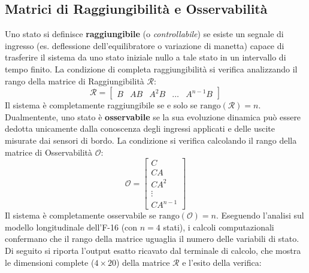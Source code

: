 \subsection{Matrici di Raggiungibilità e Osservabilità}
Uno stato si definisce \textbf{raggiungibile} (o \textit{controllabile}) se esiste un segnale di ingresso (es. deflessione dell'equilibratore o variazione di manetta) capace di trasferire il sistema da uno stato iniziale nullo a tale stato in un intervallo di tempo finito. La condizione di completa raggiungibilità si verifica analizzando il rango della matrice di Raggiungibilità $\mathcal{R}$:
\begin{equation}
    \mathcal{R} = \begin{bmatrix} B & AB & A^2B & \dots & A^{n-1}B \end{bmatrix}
\end{equation}
Il sistema è completamente raggiungibile se e solo se $\text{rango}(\mathcal{R}) = n$.
Dualmentente, uno stato è \textbf{osservabile} se la sua evoluzione dinamica può essere dedotta unicamente dalla conoscenza degli ingressi applicati e delle uscite misurate dai sensori di bordo. La condizione si verifica calcolando il rango della matrice di Osservabilità $\mathcal{O}$:
\begin{equation}
    \mathcal{O} = \begin{bmatrix} C \\ CA \\ CA^2 \\ \vdots \\ CA^{n-1} \end{bmatrix}
\end{equation}
Il sistema è completamente osservabile se $\text{rango}(\mathcal{O}) = n$. Eseguendo l'analisi sul modello longitudinale dell'F-16 (con $n=4$ stati), i calcoli computazionali confermano che il rango della matrice uguaglia il numero delle variabili di stato. Di seguito si riporta l'output esatto ricavato dal terminale di calcolo, che mostra le dimensioni complete ($4 \times 20$) della matrice $\mathcal{R}$ e l'esito della verifica:
\clearpage
